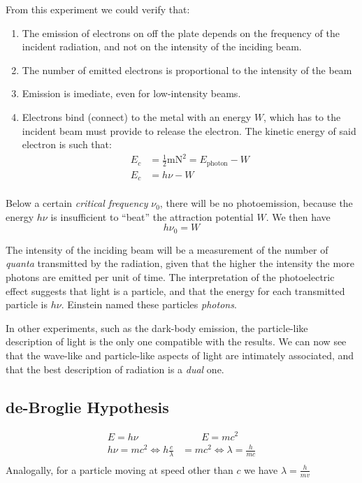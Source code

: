 \documentclass{article}[10pt]
\begin{document}

From this experiment we could verify that:
\begin{enumerate}
	\item The emission of electrons on off the plate depends on the frequency of
	      the incident radiation, and not on the intensity of the inciding beam.
	\item The number of emitted electrons is proportional to the intensity of
	      the beam
	\item Emission is imediate, even for low-intensity beams.
	\item Electrons bind (connect) to the metal with an energy $W$, which has to
	      the incident beam must provide to release the electron. The kinetic
	      energy of said electron is such that:
	      \begin{align*}
	      	E_c & = \frac{1}{2}\si{\metre\newton}^2 = E_{\text{photon}} - W \\
	      	E_c & = h\nu - W                                                \\
	      \end{align*}
\end{enumerate}
Below a certain \emph{critical frequency} $\nu_0$, there will be no
photoemission, because the energy $h\nu$ is insufficient to ``beat''
the attraction potential $W$. We then have
$$h\nu_0 = W$$

The intensity of the inciding beam will be a measurement of the number of
\emph{quanta} transmitted by the radiation, given that the higher the intensity
the more photons are emitted per unit of time. The interpretation of the
photoelectric effect suggests that light is a particle, and that the energy for
each transmitted particle is $h\nu$. Einstein named these particles \emph{photons}.

In other experiments, such as the dark-body emission, the particle-like
description of light is the only one compatible with the results. We can now see
that the wave-like and particle-like aspects of light are intimately associated,
and that the best description of radiation is a \emph{dual} one.

\subsection{de-Broglie Hypothesis}
\begin{align*}
	E=h\nu                            & \qquad E=mc^2                      \\
	h\nu=mc^2 \iff h\frac{c}{\lambda} & = mc^2 \iff \lambda = \frac{h}{mc} \\
\end{align*}
Analogally, for a particle moving at speed other than $c$ we have $\lambda = \frac{h}{mv}$
\end{document}
